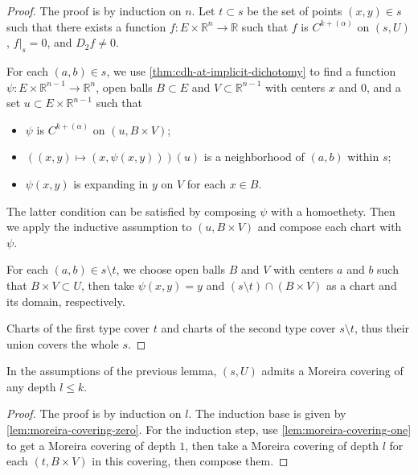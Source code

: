 \begin{proof}
  The proof is by induction on \(n\).
  Let \(t \subset s\) be the set of points \((x, y)\in s\)
  such that there exists a function \(f\colon E\times\mathbb R^{n}\to \mathbb R\)
  such that \(f\) is \(C^{k+(\alpha)}\) on \((s, U)\), \(\left.f\right|_{s}=0\), and \(D_{2}f\ne 0\).

  For each \((a, b)\in s\), we use \autoref{thm:cdh-at-implicit-dichotomy}
  to find a function \(\psi\colon E\times\mathbb R^{n - 1}\to \mathbb R^{n}\),
  open balls \(B\subset E\) and \(V\subset\mathbb R^{n - 1}\) with centers \(x\) and \(0\),
  and a set \(u\subset E\times\mathbb R^{n - 1}\) such that
  \begin{itemize}
  \item \(\psi\) is \(C^{k+(\alpha)}\) on \((u, B\times V)\);
  \item \(((x, y) \mapsto (x, \psi(x, y)))(u)\) is a neighborhood of \((a, b)\) within \(s\);
  \item \(\psi(x, y)\) is expanding in \(y\) on \(V\) for each \(x\in B\).
  \end{itemize}
  The latter condition can be satisfied by composing \(\psi\) with a homoethety.
  Then we apply the inductive assumption to \((u, B\times V)\) and compose each chart with \(\psi\).

  For each \((a, b)\in s \setminus t\), we choose open balls \(B\) and \(V\) with centers \(a\) and \(b\)
  such that \(B\times V\subset U\), then take \(\psi(x, y) = y\) and \((s \setminus t)\cap (B\times V)\)
  as a chart and its domain, respectively.

  Charts of the first type cover \(t\) and charts of the second type cover \(s \setminus t\),
  thus their union covers the whole \(s\).
\end{proof}

\begin{theorem}%
  \label{thm:moreira-covering-exists}
  In the assumptions of the previous lemma, \((s, U)\) admits a Moreira covering of any depth \(l \le k\).
\end{theorem}

\begin{proof}
  The proof is by induction on \(l\).
  The induction base is given by \autoref{lem:moreira-covering-zero}.
  For the induction step, use \autoref{lem:moreira-covering-one} to get a Moreira covering of depth \(1\),
  then take a Moreira covering of depth \(l\) for each \((t, B\times V)\) in this covering,
  then compose them.
\end{proof}

